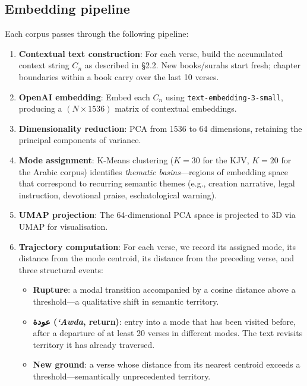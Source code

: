 \documentclass[11pt,a4paper]{article}
\theoremstyle{definition}
\begin{document}
\subsection{Embedding pipeline}

Each corpus passes through the following pipeline:

\begin{enumerate}[nosep]
  \item \textbf{Contextual text construction}: For each verse, build the accumulated context string $C_n$ as described in \S2.2. New books/surahs start fresh; chapter boundaries within a book carry over the last 10 verses.

  \item \textbf{OpenAI embedding}: Embed each $C_n$ using \texttt{text-embedding-3-small}, producing a $(N \times 1536)$ matrix of contextual embeddings.

  \item \textbf{Dimensionality reduction}: PCA from 1536 to 64 dimensions, retaining the principal components of variance.

  \item \textbf{Mode assignment}: K-Means clustering ($K=30$ for the KJV, $K=20$ for the Arabic corpus) identifies \emph{thematic basins}---regions of embedding space that correspond to recurring semantic themes (e.g., creation narrative, legal instruction, devotional praise, eschatological warning).

  \item \textbf{UMAP projection}: The 64-dimensional PCA space is projected to 3D via UMAP for visualisation.

  \item \textbf{Trajectory computation}: For each verse, we record its assigned mode, its distance from the mode centroid, its distance from the preceding verse, and three structural events:
  \begin{itemize}[nosep]
    \item \textbf{Rupture}: a modal transition accompanied by a cosine distance above a threshold---a qualitative shift in semantic territory.
    \item \textbf{\textarabic{عودة} (\emph{`Awda}, return)}: entry into a mode that has been visited before, after a departure of at least 20 verses in different modes. The text revisits territory it has already traversed.
    \item \textbf{New ground}: a verse whose distance from its nearest centroid exceeds a threshold---semantically unprecedented territory.
  \end{itemize}
\end{enumerate}
\end{document}
